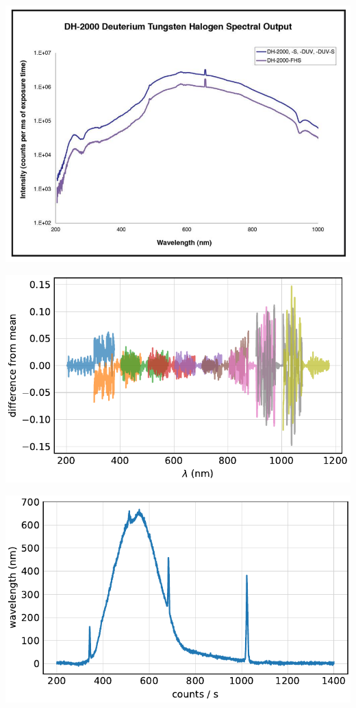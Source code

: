 \begin{frame}
	\centering
	\includegraphics[width=.8\textwidth]{./figures/dh-2000.png}
\end{frame}

\begin{frame}
	\centering
	\includegraphics{../analysis/figures/stich.pdf}
\end{frame}

\begin{frame}
	\centering
	\includegraphics{../analysis/figures/spectrum.pdf}
\end{frame}